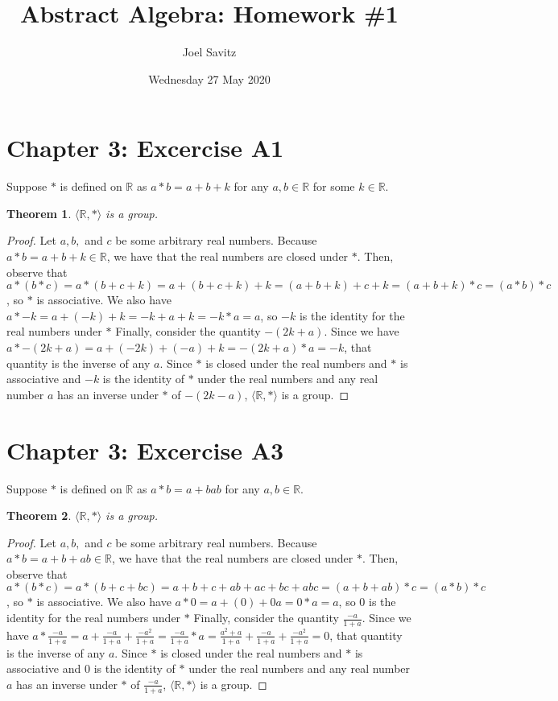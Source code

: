 \documentclass[12pt]{article}
\title{Abstract Algebra: Homework \#1}
\date{Wednesday 27 May 2020}
\author{Joel Savitz}
\newcommand{\reals}{\mathbb{R}}
\newtheorem{thm}{Theorem}
\begin{document}
\maketitle

\section{Chapter 3: Excercise A1}

Suppose $*$ is defined on $\reals$ as $a * b = a + b + k$ for any $a,b \in \reals$ for some $k \in \reals$.

\begin{thm}
	$\langle \reals, * \rangle$ is a group.
\end{thm}

\begin{proof}
	Let $a,b,$ and $c$ be some arbitrary real numbers.
	Because $a * b = a + b + k \in \reals$, we have that the real numbers are closed under $*$.
	Then, observe that $a * (b * c)  = a * (b + c + k) = a + (b + c + k) + k = (a + b + k) + c + k = (a + b + k) * c = (a * b) * c$, so $*$ is associative.
	We also have $a * -k = a + (-k) + k = -k + a + k = -k * a = a$, so $-k$ is the identity for the real numbers under $*$
	Finally, consider the quantity $-(2k+a)$. Since we have $a * -(2k+a) = a + (-2k) +  (-a) + k = -(2k+a) * a = -k$, that quantity is the inverse of any $a$.
	Since $*$ is closed under the real numbers and $*$ is associative and $-k$ is the identity of $*$ under the real numbers and any real number $a$ has an inverse under $*$ of $-(2k-a)$, $\langle \reals, * \rangle$ is a group.
\end{proof}

\section{Chapter 3: Excercise A3}

Suppose $*$ is defined on $\reals$ as $a * b = a + b ab$ for any $a,b \in \reals$.

\begin{thm}
	$\langle \reals, * \rangle$ is a group.
\end{thm}

\begin{proof}
	Let $a,b,$ and $c$ be some arbitrary real numbers.
	Because $a * b = a + b + ab \in \reals$, we have that the real numbers are closed under $*$.
	Then, observe that $a * (b * c)  = a * (b + c + bc) = a + b + c + ab + ac + bc + abc = (a + b + ab) * c = (a * b) * c$, so $*$ is associative.
	We also have $a * 0 = a + (0) + 0a = 0 * a = a$, so $0$ is the identity for the real numbers under $*$
	Finally, consider the quantity $\frac{-a}{1+a}$.
	Since we have $a * \frac{-a}{1+a} = a + \frac{-a}{1+a} +  \frac{-a^2}{1+a} = \frac{-a}{1 + a} * a = \frac{a^2+a}{1+a} + \frac{-a}{1+a} + \frac{-a^2}{1+a} = 0$, that quantity is the inverse of any $a$.
	Since $*$ is closed under the real numbers and $*$ is associative and $0$ is the identity of $*$ under the real numbers and any real number $a$ has an inverse under $*$ of $\frac{-a}{1+a}$, $\langle \reals, * \rangle$ is a group.
\end{proof}
\end{document}
